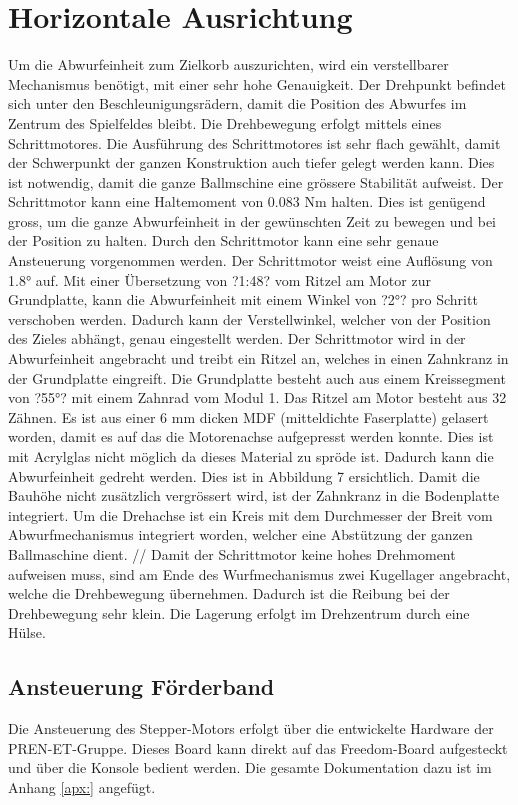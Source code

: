 \section{Horizontale Ausrichtung}

Um die Abwurfeinheit zum Zielkorb auszurichten, wird ein verstellbarer Mechanismus benötigt, mit einer sehr hohe Genauigkeit. Der Drehpunkt befindet sich unter den Beschleunigungsrädern, damit die Position des Abwurfes im Zentrum des Spielfeldes bleibt. Die Drehbewegung erfolgt mittels eines Schrittmotores. Die Ausführung des Schrittmotores ist sehr flach gewählt, damit der Schwerpunkt der ganzen Konstruktion auch tiefer gelegt werden kann. Dies ist notwendig, damit die ganze Ballmschine eine grössere Stabilität aufweist. Der Schrittmotor kann eine Haltemoment von 0.083 Nm halten. Dies ist genügend gross, um die ganze Abwurfeinheit in der gewünschten Zeit zu bewegen und bei der Position zu halten. Durch den Schrittmotor kann eine sehr genaue Ansteuerung vorgenommen werden. Der Schrittmotor weist eine Auflösung von 1.8° auf. Mit einer Übersetzung von ?1:48? vom Ritzel am Motor zur Grundplatte, kann die Abwurfeinheit mit einem Winkel von ?2°? pro Schritt verschoben werden. Dadurch kann der Verstellwinkel, welcher von der Position des Zieles abhängt, genau eingestellt werden. Der Schrittmotor wird in der Abwurfeinheit angebracht und treibt ein Ritzel an, welches in einen Zahnkranz in der Grundplatte eingreift. Die Grundplatte besteht auch aus einem Kreissegment von ?55°? mit einem Zahnrad vom Modul 1. Das Ritzel am Motor besteht aus 32 Zähnen. Es ist aus einer 6 mm dicken MDF (mitteldichte Faserplatte) gelasert worden, damit es auf das die Motorenachse aufgepresst werden konnte. Dies ist mit Acrylglas nicht möglich da dieses Material zu spröde ist. Dadurch kann die Abwurfeinheit gedreht werden. Dies ist in Abbildung 7 ersichtlich. Damit die Bauhöhe nicht zusätzlich vergrössert wird, ist der Zahnkranz in die Bodenplatte integriert. Um die Drehachse ist ein Kreis mit dem Durchmesser der Breit vom Abwurfmechanismus integriert worden, welcher eine Abstützung der ganzen Ballmaschine dient.  //
Damit der Schrittmotor keine hohes Drehmoment aufweisen muss, sind am Ende des Wurfmechanismus zwei Kugellager angebracht, welche die Drehbewegung übernehmen. Dadurch ist die Reibung bei der Drehbewegung sehr klein. Die Lagerung erfolgt im Drehzentrum durch eine Hülse.



 \subsection{Ansteuerung Förderband}

    Die Ansteuerung des Stepper-Motors erfolgt über die entwickelte Hardware der PREN-ET-Gruppe. Dieses Board kann direkt auf das Freedom-Board aufgesteckt und über die Konsole bedient werden. Die gesamte Dokumentation dazu ist im Anhang \ref{apx:} angefügt.